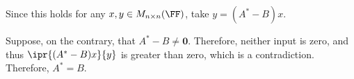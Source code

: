 \documentclass[11pt]{scrartcl}
\begin{document}
\begin{enumerate}[label=\alph*)]
  Since this holds for any $x, y\in M_{n\times n}(\FF)$, take $y=(A^{*}-B)x$.

  Suppose, on the contrary, that $A^{*}-B \neq \bm{0}$. Therefore,
  neither input is zero, and thus $ \ipr{(A^{*}-B)x}{y}$ is greater than zero, which is a contradiction. Therefore, $A^{*} = B$.




  
\end{enumerate}
\end{document}
